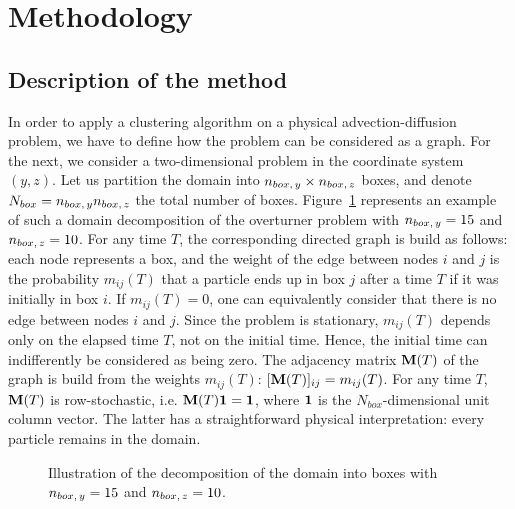\section{Methodology}
\subsection{Description of the method}
In order to apply a clustering algorithm on a physical advection-diffusion problem, we have to define how the problem can be considered as a graph. For the next, we consider a two-dimensional problem in the coordinate system $(y,z)$. Let us partition the domain into $n_{box,\,y} \times n_{box,\,z}$ boxes, and denote $N_{box} = n_{box,\,y}n_{box,\,z}$ the total number of boxes. Figure~\ref{fig:box_scheme} represents an example of such a domain decomposition of the overturner problem with $n_{box,\,y} = 15$ and $n_{box,\,z} = 10$. For any time $T$, the corresponding directed graph is build as follows: each node represents a box, and the weight of the edge between nodes $i$ and $j$ is the probability $m_{ij}(T)$ that a particle ends up in box $j$ after a time $T$ if it was initially in box $i$. If $m_{ij}(T) = 0$, one can equivalently consider that there is no edge between nodes $i$ and $j$. Since the problem is stationary, $m_{ij}(T)$ depends only on the elapsed time $T$, not on the initial time. Hence, the initial time can indifferently be considered as being zero. The adjacency matrix $\mathbf M(T)$ of the graph is build from the weights $m_{ij}(T)$: $[\mathbf M(T)]_{ij} = m_{ij}(T)$. For any time $T$, $\mathbf M(T)$ is row-stochastic, i.e. $\mathbf M(T)\mathbf 1 = \mathbf 1$, where $\mathbf 1$ is the $N_{box}$-dimensional unit column vector. The latter has a straightforward physical interpretation: every particle remains in the domain.

\begin{figure}[!htp]
	\centering
	
	\caption{Illustration of the decomposition of the domain into boxes with $n_{box,\,y} = 15$ and $n_{box,\,z} = 10$.}
	\label{fig:box_scheme}
\end{figure}

